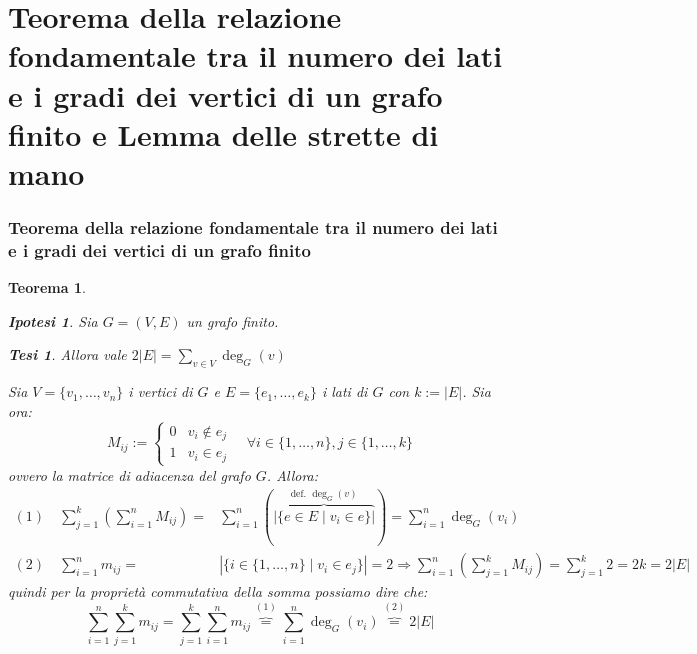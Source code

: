 \documentclass{article}
\makeatletter
\renewenvironment{proof}[1][\proofname]{\par
    \pushQED{\qed}%
    \normalfont \topsep6\p@\@plus6\p@\relax
    \trivlist
    \item\relax
    {\itshape
    #1\@addpunct{.}}\hspace\labelsep\ignorespaces
    }{%
    \popQED\endtrivlist\@endpefalse
}
\newtheorem{theorem}{Teorema}[part]
\newtheorem{ipothesis}[lemma]{Ipotesi}
\newtheorem{thesis}[lemma]{Tesi}
\makeatother
\begin{document}
\part{Teorema della relazione fondamentale tra il numero dei lati e i gradi dei vertici di un grafo finito e Lemma delle strette di mano}
    \section{Teorema della relazione fondamentale tra il numero dei lati e i gradi dei vertici di un grafo finito}
        \begin{theorem}
            \begin{ipothesis}
                Sia \(G=(V,E)\) un grafo finito.
            \end{ipothesis}
            \begin{thesis}
                Allora vale \(2|E|=\sum_{v\in V}\deg_G(v)\)
            \end{thesis}
            \begin{proof}
                Sia \(V=\{v_1,\ldots,v_n\}\) i vertici di \(G\) e \(E=\{e_1,\ldots,e_k\}\) i lati di \(G\) con \(k:=|E|\).
                Sia ora:\[
                    M_{ij}:=\begin{cases}
                        0& v_i\notin e_j\\
                        1& v_i\in e_j
                    \end{cases}\quad \forall i\in\{1,\ldots,n\},j\in\{1,\ldots,k\}
                \] ovvero la matrice di adiacenza del grafo \(G\).
                Allora:
                \[
                    \begin{aligned}
                        (1)\quad \sum_{j=1}^k\left(\sum_{i=1}^n M_{ij}\right)=&\sum_{i=1}^n\left(\overbrace{\left|\{e\in E\mid v_i\in e\}\right|}^{\text{def. }\deg_G(v)}\right)=\sum_{i=1}^n\deg_G(v_i)\\
                        (2)\quad \sum_{i=1}^n m_{ij}=&\left|\{ i\in \{1,\ldots,n\}\mid v_i\in e_j\}\right|=2\Rightarrow \sum_{i=1}^n\left(\sum_{j=1}^k M_{ij}\right)=\sum_{j=1}^k 2=2k=2|E|
                    \end{aligned}
                \]
                quindi per la proprietà commutativa della somma possiamo dire che:
                \[
                    \sum_{i=1}^n\sum_{j=1}^k m_{ij} =\sum_{j=1}^k\sum_{i=1}^n m_{ij}\overbrace{=}^{(1)}\sum_{i=1}^n\deg_G(v_i)\overbrace=^{(2)}2|E|
                \]
                \pushQED{}
            \end{proof}
            \raggedleft{{\ensuremath{\blacksquare}}}
        \end{theorem}
\end{document}
